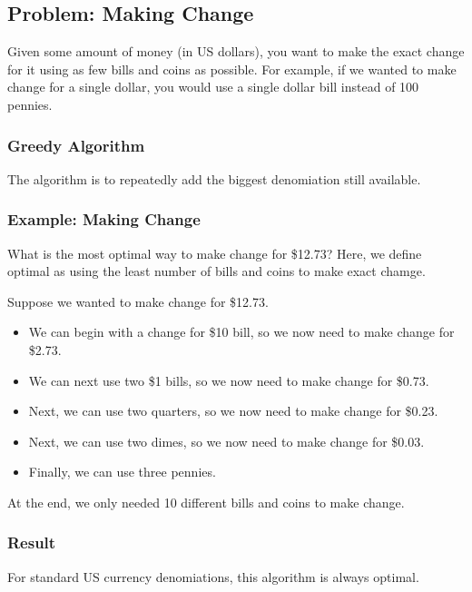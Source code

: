 \documentclass[letterpaper]{article}
\begin{document}
\subsection{Problem: Making Change}
Given some amount of money (in US dollars), you want to make the exact change for it using as few bills and coins as possible. For example, if we wanted to make change for a single dollar, you would use a single dollar bill instead of 100 pennies. 

\subsubsection{Greedy Algorithm}
The algorithm is to repeatedly add the biggest denomiation still available.

\subsubsection{Example: Making Change}
What is the most optimal way to make change for \$12.73? Here, we define optimal as using the least number of bills and coins to make exact chamge. 

\begin{mdframed}[]
    Suppose we wanted to make change for \$12.73. 
    \begin{itemize}
        \item We can begin with a change for \$10 bill, so we now need to make change for \$2.73.
        \item We can next use two \$1 bills, so we now need to make change for \$0.73. 
        \item Next, we can use two quarters, so we now need to make change for \$0.23.
        \item Next, we can use two dimes, so we now need to make change for \$0.03.
        \item Finally, we can use three pennies. 
    \end{itemize}
    At the end, we only needed 10 different bills and coins to make change.
\end{mdframed}


\subsubsection{Result}
\begin{proposition}
    For standard US currency denomiations, this algorithm is always optimal. 
\end{proposition}
\end{document}

